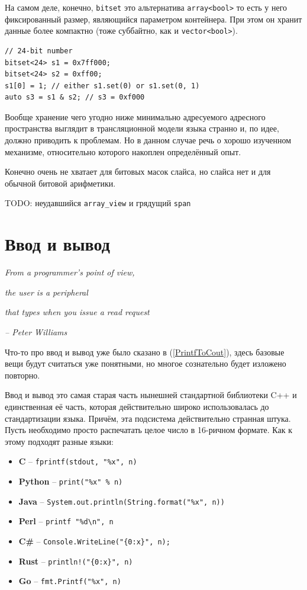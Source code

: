 \documentclass[a4paper,12pt,oneside]{book}
\begin{document}
На самом деле, конечно, \lstinline!bitset! это альтернатива \lstinline!array<bool>! то есть у него фиксированный размер, являющийся параметром контейнера. При этом он хранит данные более компактно (тоже суббайтно, как и \lstinline!vector<bool>!).

\begin{lstlisting}
// 24-bit number
bitset<24> s1 = 0x7ff000;
bitset<24> s2 = 0xff00;
s1[0] = 1; // either s1.set(0) or s1.set(0, 1)
auto s3 = s1 & s2; // s3 = 0xf000
\end{lstlisting}

Вообще хранение чего угодно ниже минимально адресуемого адресного пространства выглядит в трансляционной модели языка странно и, по идее, должно приводить к проблемам. Но в данном случае речь о хорошо изученном механизме, относительно которого накоплен определённый опыт.

Конечно очень не хватает для битовых масок слайса, но слайса нет и для обычной битовой арифметики.

TODO: неудавшийся \lstinline!array_view! и грядущий \lstinline!span!

\pagebreak
\section{Ввод и вывод}\label{subsec:iostreams}

\hfill\textit{From a programmer's point of view,}

\hfill\textit{the user is a peripheral}

\hfill\textit{that types when you issue a read request}{\vspace{0.5em}}

\hfill\textit{-- Peter Williams} 

Что-то про ввод и вывод уже было сказано в (\ref{PrintfToCout}), здесь базовые вещи будут считаться уже понятными, но многое сознательно будет изложено повторно. 

Ввод и вывод это самая старая часть нынешней стандартной библиотеки C++ и единственная её часть, которая действительно широко использовалась до стандартизации языка. Причём, эта подсистема действительно странная штука. Пусть необходимо просто распечатать целое число в 16-ричном формате. Как к этому подходят разные языки:

\begin{itemize}
\item \textbf{C } -- \lstinline!fprintf(stdout, "%x", n)!
\item \textbf{Python} -- \lstinline!print("%x" % n)!
\item \textbf{Java} -- \lstinline!System.out.println(String.format("%x", n))!
\item \textbf{Perl} -- \lstinline!printf "%d\n", n!
\item \textbf{C\#} -- \lstinline!Console.WriteLine("{0:x}", n);!
\item \textbf{Rust} -- \lstinline?println!("{0:x}", n)?
\item \textbf{Go} -- \lstinline!fmt.Printf("%x", n)!
\end{itemize}
\end{document}
